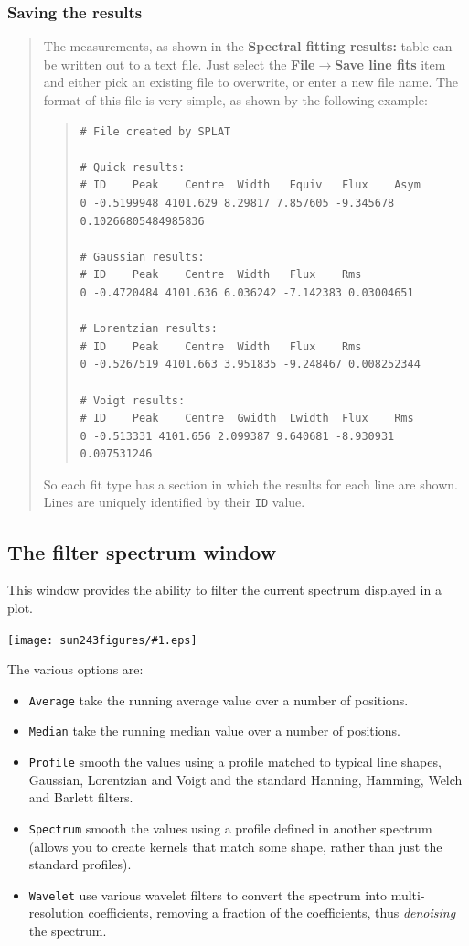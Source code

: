 \documentclass[twoside,11pt]{article}
\newcommand{\htmladdimg}[1]{}
\newcommand{\latexhtml}[2]{#1}
\renewcommand{\_}{\texttt{\symbol{95}}}
\newcommand{\mainfigure}[1]
{\begin{center}
 \latexhtml{\texttt{[image: sun243\_figures/\#1.eps]}}{\htmladdimg{#1.gif}}
 \end{center}
}
\newcommand{\submenuitem}[2]{\latexhtml{\textbf{#1$\rightarrow$#2}}{\textbf{#1->#2}}}
\newcommand{\labelitem}[1]{\textbf{#1}}
\newcommand{\hitext}[1]{\texttt{#1}}
\begin{document}
\subsubsection{Saving the results}
\begin{quote}
 The measurements, as shown in the \labelitem{Spectral fitting
 results:} table can be written out to a text file. Just select the
 \submenuitem{File}{Save line fits} item and either pick an existing file
 to overwrite, or enter a new file name. The format of this file is
 very simple, as shown by the following example:
 \begin{quote}
  \begin{verbatim}
# File created by SPLAT

# Quick results:
# ID    Peak    Centre  Width   Equiv   Flux    Asym
0 -0.5199948 4101.629 8.29817 7.857605 -9.345678 0.10266805484985836

# Gaussian results:
# ID    Peak    Centre  Width   Flux    Rms
0 -0.4720484 4101.636 6.036242 -7.142383 0.03004651

# Lorentzian results:
# ID    Peak    Centre  Width   Flux    Rms
0 -0.5267519 4101.663 3.951835 -9.248467 0.008252344

# Voigt results:
# ID    Peak    Centre  Gwidth  Lwidth  Flux    Rms
0 -0.513331 4101.656 2.099387 9.640681 -8.930931 0.007531246
  \end{verbatim}
 \end{quote}
 So each fit type has a section in which the results for each line are
 shown. Lines are uniquely identified by their \hitext{ID} value.
\end{quote}

\newpage
\subsection{The filter spectrum window}

This window provides the ability to filter the current spectrum
displayed in a plot.

\mainfigure{filterwindow}

The various options are:
\begin{itemize}
  \item \hitext{Average} take the running average value over a
        number of positions.
  \item \hitext{Median} take the running median value over a
        number of positions.
  \item \hitext{Profile} smooth the values using a profile matched
        to typical line shapes, Gaussian, Lorentzian and Voigt and
        the standard Hanning, Hamming, Welch and Barlett filters.
  \item \hitext{Spectrum} smooth the values using a profile
        defined in another spectrum (allows you to create kernels
        that match some shape, rather than just the standard profiles).
  \item \hitext{Wavelet} use various wavelet filters to convert the
        spectrum into multi-resolution coefficients, removing a
        fraction of the coefficients, thus \textit{denoising} the
        spectrum.
\end{itemize}
\end{document}
